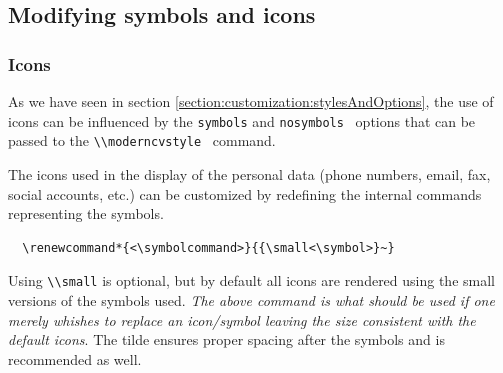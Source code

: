 \documentclass[a4paper,11pt]{article}
\newcommand{\code}[1]{\lstinline!#1!}
\newcommand{\Code}[1]{\lstinline!#1!~} %
\begin{document}
\subsection{Modifying symbols and icons}
\subsubsection{Icons}
As we have seen in section \ref{section:customization:stylesAndOptions}, the use of icons can be
influenced by the \code{symbols} and \Code{nosymbols} options that can be passed to the \Code{\\moderncvstyle} command. \medskip

The icons used in the display of the personal data (phone numbers, email, fax, social accounts, etc.) can be customized by redefining the internal commands representing the symbols.
\begin{lstlisting}
  \renewcommand*{<\symbolcommand>}{{\small<\symbol>}~}
\end{lstlisting}
Using \code{\\small} is optional, but by default all icons are rendered using the small
versions of the symbols used. \emph{The above command is what should be used if one merely whishes to
  replace an icon/symbol leaving the size consistent with the default icons}.
The tilde ensures proper spacing after the symbols and is recommended as well.
\end{document}

